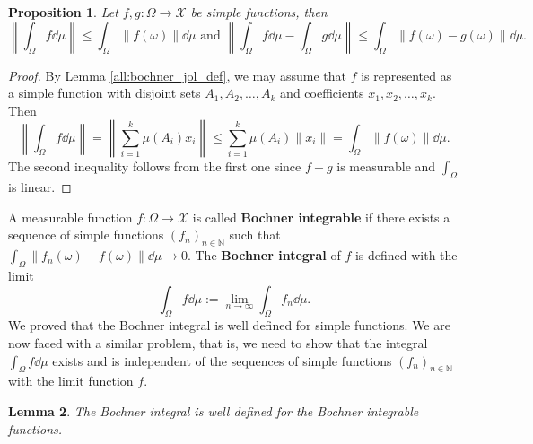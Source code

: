 \documentclass[a4paper, 12pt]{article}
\newtheorem{lem}{Lemma}[section]
\newtheorem{state}[lem]{Proposition}
\begin{document}
\begin{state}\label{all:bochner-integral-becsles} Let $f,g \colon \Omega \rightarrow \mathcal{X}$ be simple functions, then $$\left \| \int_{\Omega} f \dd{\mu} \right \| \leqslant \int_{\Omega} \| f(\omega) \|\dd{\mu} \text{ and } \left \| \int_{\Omega} f \dd{\mu}- \int_{\Omega} g \dd{\mu} \right \| \leqslant \int_{\Omega} \| f(\omega) - g(\omega) \| \dd{\mu}.$$
\end{state}
\begin{proof}
By Lemma \ref{all:bochner_jol_def}, we may assume that $f$ is represented as a simple function with disjoint sets $A_1, A_2, \ldots, A_k$ and coefficients $x_1, x_2, \ldots, x_k$. Then 
$$
\left \| \int_{\Omega} f \dd{\mu} \right \| = \left \| \sum^{k}_{i=1} \mu(A_i) x_i  \right \| \leqslant \sum^k_{i=1} \mu(A_i) \| x_i \| = \int_{\Omega} \| f(\omega) \| \dd{\mu}.
$$
The second inequality follows from the first one since $f-g$ is measurable and $\int_\Omega$ is linear.
\end{proof}
A measurable function $f \colon \Omega \rightarrow \mathcal{X}$ is called \textbf{Bochner integrable} if there exists a sequence of simple functions $(f_n)_{n \in \mathbb{N}}$ such that $\int_{\Omega} \| f_n(\omega) - f(\omega) \| \dd{\mu} \rightarrow 0$. The \textbf{Bochner integral} of $f$ is defined with the limit 
$$
\int_{\Omega} f \dd{\mu} := \lim\limits_{n \to \infty} \int_{\Omega} f_n \dd{\mu}.
$$
We proved that the Bochner integral is well defined for simple functions. We are now faced with a similar problem, that is, we need to show that the integral $\int_{\Omega} f \dd{\mu}$ exists and is independent of the sequences of simple functions $(f_n)_{n \in \mathbb{N}}$ with the limit function $f$.
\begin{lem} The Bochner integral is well defined for the Bochner integrable functions.
\end{lem}
\end{document}
